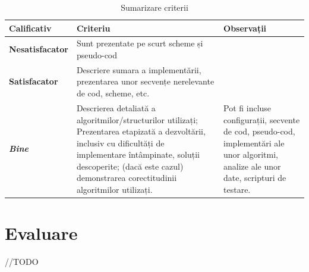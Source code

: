 \documentclass[12pt,a4paper]{report}
\numberwithin{equation}{section} %
\begin{document}
\begin{table}[th]\small\linespread{1}
	\caption{Sumarizare criterii}
	\label{tab:criterii}
	\begin{tabular}{l >{\raggedright\arraybackslash}p{8cm} >{\raggedright\arraybackslash}p{4cm}}
		\textbf{Calificativ}    & \textbf{Criteriu}                                                                                                                                                                                                                                & \textbf{Observații}                                                                                                                     \\\hline
		\textbf{Nesatisfacator} & Sunt prezentate pe scurt scheme și pseudo-cod                                                                                                                                                                                                    &                                                                                                                                         \\\hline
		\textbf{Satisfacator}   & Descriere sumara a implementării, prezentarea unor secvențe nerelevante de cod, scheme, etc.                                                                                                                                                     &                                                                                                                                         \\
		\hline
		\textbf{\textit{Bine}}  & Descrierea detaliată a algoritmilor/structurilor utilizați; Prezentarea etapizată a dezvoltării, inclusiv cu dificultăți de implementare întâmpinate, soluții descoperite; (dacă este cazul) demonstrarea corectitudinii algoritmilor utilizați. & Pot fi incluse configurații, secvente de cod, pseudo-cod, implementări ale unor algoritmi, analize ale unor date, scripturi de testare. \\
		\hline
	\end{tabular}
\end{table}


\chapter{\label{sec:evaluare}Evaluare}

//TODO
\end{document}
